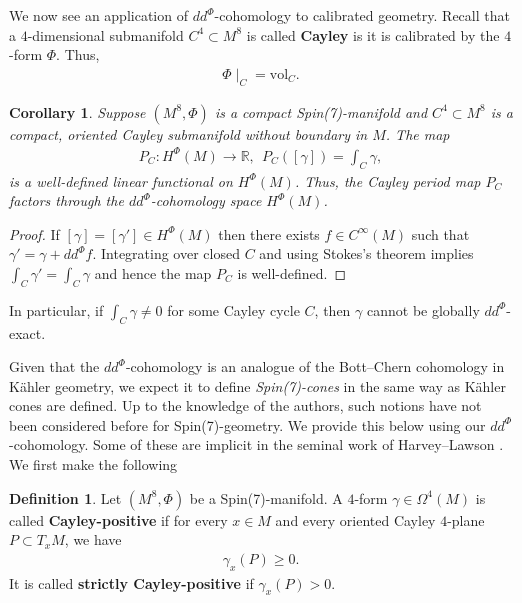 \documentclass[10pt,a4paper,reqno]{article}
\newtheorem{corollary}[theorem]{Corollary}
\theoremstyle{definition}
\newtheorem{definition}[theorem]{Definition}
\numberwithin{equation}{section}
\def\bR{\mathbb R}
\newcommand{\vol}{\mathrm{vol}}
\def\ddphi{dd^{\Phi}}
\begin{document}
We now see an application of $\ddphi$-cohomology to calibrated geometry. Recall that a $4$-dimensional submanifold $C^4\subset M^8$ is called \textbf{Cayley} is it is calibrated by the $4$-form $\Phi$. Thus,
\begin{align*}
\Phi\mid_C = \vol_C.
\end{align*}

\begin{corollary}
Suppose $(M^8, \Phi)$ is a compact Spin(7)-manifold and $C^4\subset M^8$ is a compact, oriented Cayley submanifold without boundary in $M$. The map
\begin{align*}
P_C: H^{\Phi}(M) \rightarrow \bR,\ \ P_C([\gamma]) = \int_C \gamma,
\end{align*}
is a well-defined linear functional on $H^{\Phi}(M)$. Thus, the Cayley period map $P_C$ factors through the $\ddphi$-cohomology space $H^{\Phi}(M)$. 
\end{corollary}
\begin{proof}
If $[\gamma]=[\gamma']\in H^{\Phi}(M)$ then there exists $f\in C^{\infty}(M)$ such that $\gamma'=\gamma + \ddphi f$. Integrating over closed $C$ and using Stokes's theorem implies $\int_C \gamma'=\int_C\gamma$ and hence the map $P_C$ is well-defined.
\end{proof}
In particular, if $\int_C \gamma \neq 0$ for some Cayley cycle $C$, then $\gamma$ cannot be globally $\ddphi$-exact.

\medskip

Given that the $\ddphi$-cohomology is an analogue of the Bott--Chern cohomology in K\"ahler geometry, we expect it to define \emph{Spin(7)-cones} in the same way as K\"ahler cones are defined. Up to the knowledge of the authors, such notions have not been considered before for Spin(7)-geometry. We provide this below using our $\ddphi$-cohomology. Some of these are implicit in the seminal work of Harvey--Lawson \cite{HL-intropotential}. We first make the following

\begin{definition}\label{def:cayleypositive}
Let $(M^8, \Phi)$ be a Spin(7)-manifold. 
A $4$-form $\gamma\in \Omega^4(M)$ is called \textbf{Cayley-positive} if for every $x\in M$ and every oriented Cayley $4$-plane $P\subset T_xM$, we have
\begin{align}\label{eq:cayleypositiveeqn}
\gamma_x(P)\geq 0.    
\end{align}
It is called \textbf{strictly Cayley-positive} if $\gamma_x(P)>0$.
\end{definition}
\end{document}
